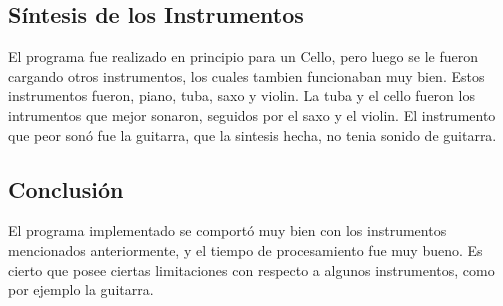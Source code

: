\documentclass[../ASSD_TP2.tex]{subfiles}
\begin{document}
\subsection*{S\'intesis de los Instrumentos}
El programa fue realizado en principio para un Cello, pero luego se le fueron cargando otros instrumentos, los cuales tambien funcionaban muy bien. Estos instrumentos fueron, piano, tuba, saxo y violin. La tuba y el cello fueron los intrumentos que mejor sonaron, seguidos por el saxo y el violin.
El instrumento que peor son\'o fue la guitarra, que la sintesis hecha, no tenia sonido de guitarra.

\subsection*{Conclusi\'on}
El programa implementado se comport\'o muy bien con los instrumentos mencionados anteriormente, y el tiempo de procesamiento fue muy bueno. Es cierto que posee ciertas limitaciones con respecto a algunos instrumentos, como por ejemplo la guitarra. 
\end{document}
